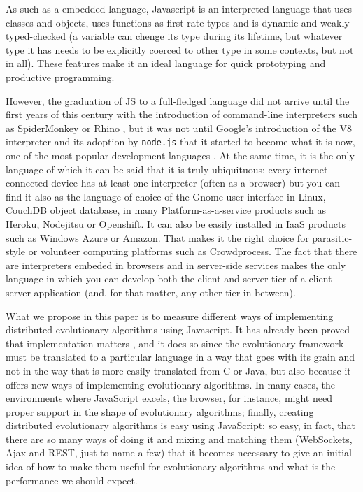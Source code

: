 \documentclass{sig-alternate}
\begin{document}
As such as a embedded language, Javascript is an interpreted language
that uses classes and objects, uses functions as first-rate types and
is dynamic and weakly typed-checked (a variable can chenge its type during
its lifetime, but whatever type it has needs to be explicitly coerced
to other type in some contexts, but not in all). These features make
it an ideal language for quick prototyping and productive
programming. 

However, the graduation of JS to a full-fledged language did not arrive until the first years of
this century with the introduction of command-line interpreters such
as SpiderMonkey or Rhino \cite{mikkonen2007using}, but it was not
until Google's introduction of the V8 \cite{richards2010analysis}
interpreter and its adoption by  {\tt node.js} that it started to
become what it is now, one of the most popular development languages
\cite{ogrady14:ranking}. At the same time, it is the only language of
which it can be said that it is truly ubiquituous; every
internet-connected device has at least one interpreter
\cite{crockford:javascript} (often as a browser) but you can find it
also as the language of choice of the Gnome user-interface in Linux,
CouchDB object database, in many Platform-as-a-service products such
as Heroku, Nodejitsu or Openshift. It can also be easily installed in
IaaS products such as Windows Azure or Amazon. That makes it the right
choice for parasitic-style or volunteer computing platforms such as
Crowdprocess. The fact that there are interpreters embeded in browsers
and in server-side services makes the only language in which you can
develop both the client and server tier of a client-server application
(and, for that matter, any other tier in between).

What we propose in this paper is to measure different ways of
implementing distributed evolutionary algorithms using Javascript. It
has already been proved that implementation matters
\cite{DBLP:conf/iwann/MereloRACML11}, and it does so since the
evolutionary framework must be translated to a particular language in
a way that goes with its grain and not in the way that is more easily
translated from C or Java, but also because it offers new ways of
implementing evolutionary algorithms. In many cases, the environments
where JavaScript excels, the browser, for instance, might need proper
support in the shape of evolutionary algorithms; finally, creating
distributed evolutionary algorithms is easy using JavaScript; so easy,
in fact, that there are so many ways of doing it and mixing and
matching them (WebSockets, Ajax and REST, just to name a few) that it
becomes necessary to give an initial idea of how to make them useful
for evolutionary algorithms and what is the performance we should
expect. 
\end{document}
